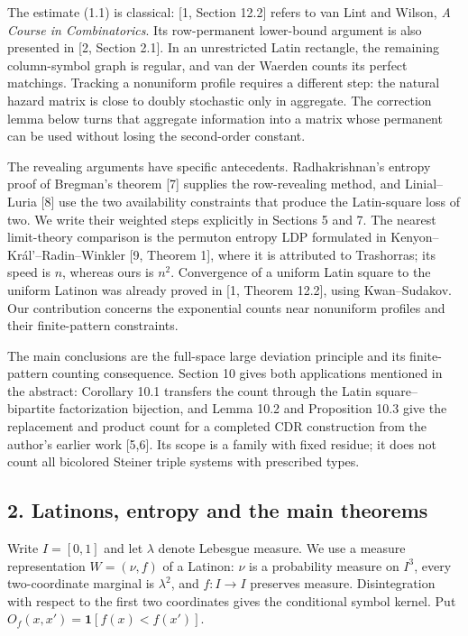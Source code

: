\documentclass[english,11pt,a4paper]{article}
\begin{document}
The estimate (1.1) is classical: {[}1, Section 12.2{]} refers to van Lint and Wilson, \emph{A Course in Combinatorics}. Its row-permanent lower-bound argument is also presented in {[}2, Section 2.1{]}. In an unrestricted Latin rectangle, the remaining column-symbol graph is regular, and van der Waerden counts its perfect matchings. Tracking a nonuniform profile requires a different step: the natural hazard matrix is close to doubly stochastic only in aggregate. The correction lemma below turns that aggregate information into a matrix whose permanent can be used without losing the second-order constant.

The revealing arguments have specific antecedents. Radhakrishnan's entropy proof of Bregman's theorem {[}7{]} supplies the row-revealing method, and Linial--Luria {[}8{]} use the two availability constraints that produce the Latin-square loss of two. We write their weighted steps explicitly in Sections 5 and 7. The nearest limit-theory comparison is the permuton entropy LDP formulated in Kenyon--Král'--Radin--Winkler {[}9, Theorem 1{]}, where it is attributed to Trashorras; its speed is \(n\), whereas ours is \(n^2\). Convergence of a uniform Latin square to the uniform Latinon was already proved in {[}1, Theorem 12.2{]}, using Kwan--Sudakov. Our contribution concerns the exponential counts near nonuniform profiles and their finite-pattern constraints.

The main conclusions are the full-space large deviation principle and its finite-pattern counting consequence. Section 10 gives both applications mentioned in the abstract: Corollary 10.1 transfers the count through the Latin square--bipartite factorization bijection, and Lemma 10.2 and Proposition 10.3 give the replacement and product count for a completed CDR construction from the author's earlier work {[}5,6{]}. Its scope is a family with fixed residue; it does not count all bicolored Steiner triple systems with prescribed types.

\subsection{2. Latinons, entropy and the main theorems}\label{latinons-entropy-and-the-main-theorems}

Write \(I=[0,1]\) and let \(\lambda\) denote Lebesgue measure. We use a measure representation \(W=(\nu,f)\) of a Latinon: \(\nu\) is a probability measure on \(I^3\), every two-coordinate marginal is \(\lambda^2\), and \(f:I\to I\) preserves measure. Disintegration with respect to the first two coordinates gives the conditional symbol kernel. Put \(O_f(x,x')=\mathbf1[f(x)<f(x')]\).
\end{document}

